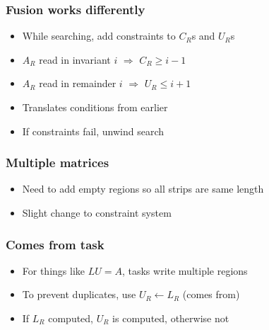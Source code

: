 \documentclass{beamer}
\newcommand*{\bracelabel}[4]{\draw (#1) to[brace #3]%
  node[midway,label={[dim-label]#3:#4}] {} (#2)}
\newcommand*{\emptyreg}[1]{\draw (#1.north west) -- (#1.south east) (#1.south west) -- (#1.north east)}
\begin{document}
\begin{frame}
  \frametitle{Fusion works differently}

  \begin{itemize}
  \item While searching, add constraints to $C_R$s and $U_R$s
  \item $A_R$ read in invariant $i$ $\Rightarrow$ $C_R \geq i - 1$
  \item $A_R$ read in remainder $i$ $\Rightarrow$ $U_R \leq i + 1$
  \item Translates conditions from earlier
  \item If constraints fail, unwind search
  \end{itemize}
\end{frame}

\begin{frame}
  \frametitle{Multiple matrices}
  \begin{itemize}
  \item Need to add empty regions so all strips are same length
  \item Slight change to constraint system
  \end{itemize}

\end{frame}

\begin{frame}
  \frametitle{Comes from task}
  \begin{itemize}
  \item For things like $LU = A$, tasks write multiple regions
  \item To prevent duplicates, use $U_R \leftarrow L_R$ (comes from)
  \item If $L_R$ computed, $U_R$ is computed, otherwise not
  \end{itemize}
\end{frame}
\end{document}
